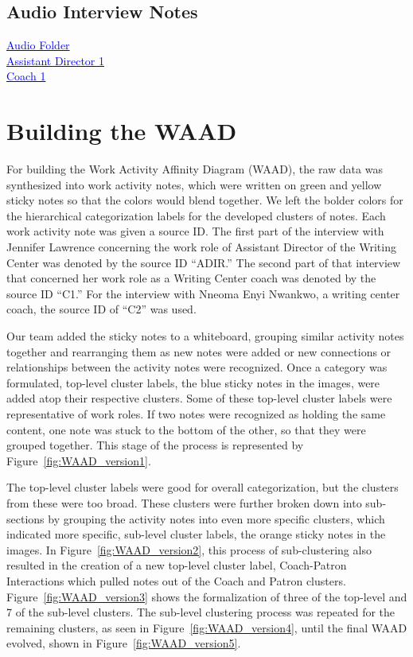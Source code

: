 \documentclass[12pt]{article} %
\begin{document}
  \subsection*{Audio Interview Notes} %
  \href{http://www.dropbox.specialorange.com/vt/5714%20UX/}{\textcolor{blue}{Audio Folder}}\\
  \href{http://www.dropbox.specialorange.com/vt/5714%20UX/ADir1.aac}{\textcolor{blue}{Assistant Director 1}}\\
  \hspace{1.5cm}\href{http://www.dropbox.specialorange.com/vt/5714%20UX/C1.aac}{\textcolor{blue}{Coach 1}}\\

\section{Building the WAAD}

For building the Work Activity Affinity Diagram (WAAD), the raw data was synthesized into work activity notes, which were written on green and yellow sticky notes so that the colors would blend together.  We left the bolder colors for the hierarchical categorization labels for the developed clusters of notes.  Each work activity note was given a source ID.  The first part of the interview with Jennifer Lawrence concerning the work role of Assistant Director of the Writing Center was denoted by the source ID “ADIR.”  The second part of that interview that concerned her work role as a Writing Center coach was denoted by the source ID “C1.”  For the interview with Nneoma Enyi Nwankwo, a writing center coach, the source ID of “C2” was used. 

Our team added the sticky notes to a whiteboard, grouping similar activity notes together and rearranging them as new notes were added or new connections or relationships between the activity notes were recognized.  Once a category was formulated, top-level cluster labels, the blue sticky notes in the images, were added atop their respective clusters.  Some of these top-level cluster labels were representative of work roles.  If two notes were recognized as holding the same content, one note was stuck to the bottom of the other, so that they were grouped together.  This stage of the process is represented by Figure~\ref{fig:WAAD_version1}. 

The top-level cluster labels were good for overall categorization, but the clusters from these were too broad.  These clusters were further broken down into sub-sections by grouping the activity notes into even more specific clusters, which indicated more specific, sub-level cluster labels, the orange sticky notes in the images.  In Figure~\ref{fig:WAAD_version2}, this process of sub-clustering also resulted in the creation of a new top-level cluster label, Coach-Patron Interactions which pulled notes out of the Coach and Patron clusters. Figure~\ref{fig:WAAD_version3} shows the formalization of three of the top-level and 7 of the sub-level clusters.  The sub-level clustering process was repeated for the remaining clusters, as seen in Figure~\ref{fig:WAAD_version4}, until the final WAAD evolved, shown in Figure~\ref{fig:WAAD_version5}.
\end{document}
